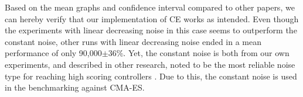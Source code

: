 Based on the mean graphs and confidence interval compared to other papers, we can
hereby verify that our implementation of CE works as intended. Even though the
experiments with linear decreasing noise in this case seems to outperform
the constant noise, other runs with linear decreasing noise ended in a mean 
performance of only 90,000$\pm36\%$. Yet, the constant noise is both from our
own experiments, and described in other research, noted to be the most reliable
noise type for reaching high scoring controllers \citep{scherrer2009}. 
Due to this, the constant noise is used in the 
benchmarking against CMA-ES.\\



